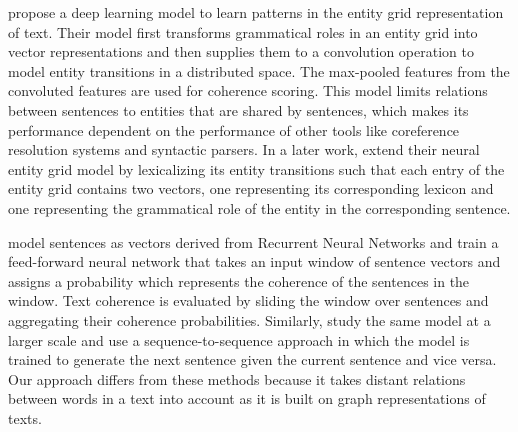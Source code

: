  propose a deep learning model to learn patterns in the entity grid representation of text. 
Their model first transforms grammatical roles in an entity grid into vector representations and then supplies them to a convolution operation to model entity transitions in a distributed space. 
The max-pooled features from the convoluted features are used for coherence scoring. 
This model limits relations between sentences to entities that are shared by sentences, which makes its performance dependent on the performance of other tools like coreference resolution systems and syntactic parsers. 
In a later work,  extend their neural entity grid model by lexicalizing its entity transitions such that each entry of the entity grid contains two vectors, one representing its corresponding lexicon and one representing the grammatical role of the entity in the corresponding sentence.  

 model sentences as vectors derived from Recurrent Neural Networks \cite{goldberg17} and train a \mbox{feed-forward} neural network that takes an input window of sentence vectors and assigns a probability which represents the coherence of the sentences in the window. 
Text coherence is evaluated by sliding the window over sentences and aggregating their coherence probabilities. 
Similarly,  study the same model at a larger scale and use a \mbox{sequence-to-sequence} approach in which the model is trained to generate the next sentence given the current sentence and vice versa. 
Our approach differs from these methods because it takes distant relations between words in a text into account as it is built on graph representations of texts.   

